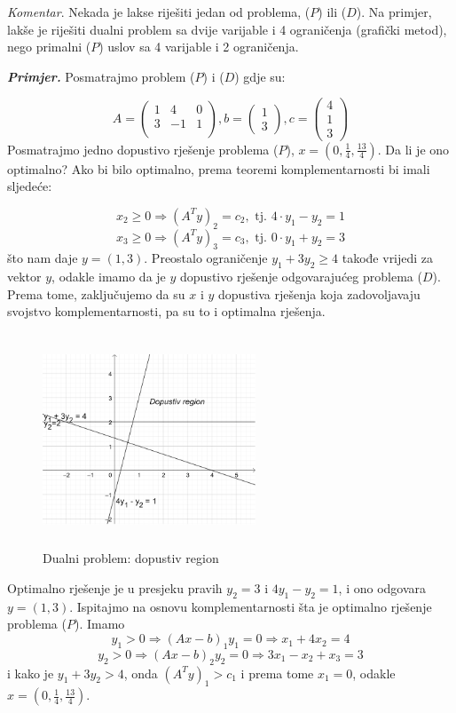 \documentclass[a4paper, utf8, 11pt, colorlinks]{book}
\begin{document}
\emph{Komentar}.  Nekada je lakse riješiti jedan od problema, ($P$)  ili  ($D$).  Na primjer, lakše je riješiti dualni problem sa dvije varijable i 4 ograničenja (grafički metod), nego primalni  ($P$)  uslov sa 4 varijable i 2 ograničenja. 

\emph{\textbf{Primjer.}} Posmatrajmo problem  ($P$)  i  ($D$)  gdje su:
 
$$      A = \left(\begin{array}{ccc}
          1 &  4 & 0 \\
          3 & -1 & 1 \\
      \end{array} \right ), b = \left (\begin{array}{c}
           1 \\
           3
      \end{array}\right ), c =\left ( \begin{array}{c}
           4  \\
           1  \\
           3
      \end{array} \right )
 $$
Posmatrajmo jedno dopustivo rješenje problema  ($P$), $x = (0, \frac{1}{4}, \frac{13}{4})$. Da li je ono optimalno? Ako bi bilo optimalno,  prema teoremi komplementarnosti bi imali sljedeće:

$$x_2 \geq 0 \Rightarrow  (A^T y)_2  = c_2, \mbox{ tj. } 4 \cdot y_1 - y_2 = 1$$
$$x_3 \geq 0 \Rightarrow  (A^T y)_3  = c_3, \mbox{ tj. } 0 \cdot y_1 + y_2 = 3$$
što nam daje  $y = (1, 3)$. Preostalo ograničenje $y_1 + 3 y_2 \geq 4$ takođe vrijedi za vektor $y$, odakle imamo da je $y$ dopustivo rješenje odgovarajućeg problema  ($D$).  Prema tome, zaključujemo da su $x$ i $y$ dopustiva rješenja koja zadovoljavaju svojstvo komplementarnosti, pa su to i optimalna rješenja. 

\begin{figure}[!ht]
    \centering
     \includegraphics[width=180pt, height=180pt]{fig5.eps}
    \caption{Dualni problem: dopustiv region}
    \label{fig:fig5}
\end{figure}
Optimalno rješenje je u presjeku pravih $y_2 = 3$ i $4y_1 - y_2 = 1$, i ono odgovara $y = (1, 3)$. Ispitajmo na osnovu komplementarnosti šta je optimalno rješenje problema ($P$). Imamo 
$$y_1 > 0 \Rightarrow (Ax - b)_1 y_1 = 0 \Rightarrow x_1 + 4 x_2 = 4 $$
$$y_2 > 0 \Rightarrow (Ax - b)_2 y_2 = 0 \Rightarrow 3x_1 - x_2 + x_3 = 3 $$
i kako je $y_1 + 3 y_2 > 4$, onda $(A^Ty)_1 > c_1$ i prema tome $x_1 =0$, 
odakle $x =(0, \frac{1}{4}, \frac{13}{4})$. 
\end{document}
